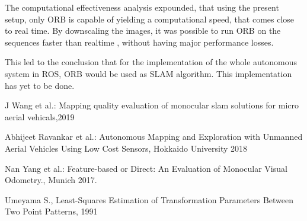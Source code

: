 \documentclass[runningheads]{llncs}
\begin{document}
The computational effectiveness analysis expounded, that using the present setup, only ORB is capable of yielding a computational speed, that comes
close to real time. By downscaling the images, it was possible to 
run ORB on the sequences faster than realtime , without having major performance losses. 

This led to the conclusion that for the implementation of the whole 
autonomous system in ROS, ORB would be used as SLAM algorithm. This implementation has yet to be done. 


%
%
%
% 
% 
%
\begin{thebibliography}{8}

J Wang et al.: Mapping quality evaluation of monocular slam solutions for micro aerial vehicals,2019

Abhijeet Ravankar et al.: Autonomous Mapping and Exploration with
Unmanned Aerial Vehicles Using Low Cost Sensors, Hokkaido University 2018

Nan Yang et al.: Feature-based or Direct: An Evaluation of Monocular Visual Odometry., Munich 2017.


Umeyama S., Least-Squares Estimation of Transformation Parameters Between Two Point Patterns, 1991


\end{thebibliography}
\end{document}
